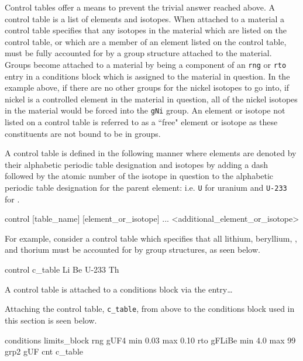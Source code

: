 Control tables offer a means to prevent the trivial answer reached above. 
A control table is a list of elements and isotopes. When attached to a material
a control table specifies that any isotopes in the material which are listed
on the control table, or which are a member of an element listed on the control
table, must be fully accounted for by a group structure attached to the 
material. Groups become attached to a material by being a component of an
\texttt{rng} or \texttt{rto} entry in a conditions block which is assigned to
the material in question. In the example above, if there are no other groups
for the nickel isotopes to go into, if nickel is a controlled element in the 
material in question, all of the nickel isotopes in the material would be
forced into the \texttt{gNi} group. An element or isotope not listed on a
control table is referred to as a ``free" element or isotope as these 
constituents are not bound to be in groups.

A control table is defined in the following manner where elements are denoted
by their alphabetic periodic table designation and isotopes by adding a dash
followed by the atomic number of the isotope in question to the alphabetic
periodic table designation for the parent element: i.e. \texttt{U} for uranium
and \texttt{U-233} for .

\begin{lt}
control [table_name]
[element_or_isotope]
...
<additional_element_or_isotope>
\end{lt}

For example, consider a control table which specifies that all lithium,
beryllium, , and thorium must be accounted for by group structures, as
seen below.

\begin{li}
control c_table
Li Be U-233 Th
\end{li}

A control table is attached to a conditions block via the entry\ldots

\begin{lt}
\end{lt}

Attaching the control table, \texttt{c\_table}, from above to the conditions
block used in this section is seen below.

\begin{li}
conditions limits_block
rng gUF4    min 0.03    max 0.10
rto gFLiBe  min 4.0 max 99  grp2    gUF
cnt c_table
\end{li}

